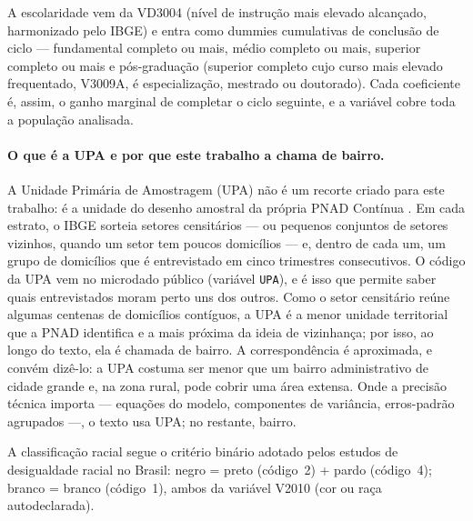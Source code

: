 \documentclass[11pt, a4paper, oneside]{article}
\begin{document}
A escolaridade vem da VD3004 (nível de instrução mais elevado alcançado, harmonizado
pelo IBGE) e entra como {dummies} {cumulativas} de conclusão de ciclo
--- fundamental completo ou mais, médio completo ou mais, superior completo ou mais e
pós-graduação (superior completo cujo curso mais elevado frequentado, V3009A, é
especialização, mestrado ou doutorado). Cada coeficiente é, assim, o ganho marginal de
completar o ciclo seguinte, e a variável cobre toda a população analisada.

\paragraph{O que é a UPA e por que este trabalho a chama de bairro.}
A Unidade Primária de Amostragem (UPA) {não} é um recorte criado para este trabalho: é
a unidade do desenho amostral da própria PNAD Contínua \cite{ibge_pnad_2023}. Em cada estrato,
o IBGE sorteia setores censitários --- ou pequenos conjuntos de setores vizinhos, quando um
setor tem poucos domicílios --- e, dentro de cada um, um grupo de domicílios que é entrevistado
em cinco trimestres consecutivos. O código da UPA vem no microdado público (variável
\texttt{UPA}), e é isso que permite saber quais entrevistados moram perto uns dos outros. Como
o setor censitário reúne algumas centenas de domicílios contíguos, a UPA é a menor unidade
territorial que a PNAD identifica e a mais próxima da ideia de vizinhança; por isso, ao longo
do texto, ela é chamada de {bairro}. A correspondência é aproximada, e convém dizê-lo:
a UPA costuma ser menor que um bairro administrativo de cidade grande e, na zona rural, pode
cobrir uma área extensa. Onde a precisão técnica importa --- equações do modelo, componentes de
variância, erros-padrão agrupados ---, o texto usa UPA; no restante, bairro.

A classificação racial segue o critério binário adotado pelos estudos
de desigualdade racial no Brasil: {negro} = preto (código~2) +
pardo (código~4); {branco} = branco (código~1), ambos da variável
V2010 (cor ou raça autodeclarada).
\end{document}
